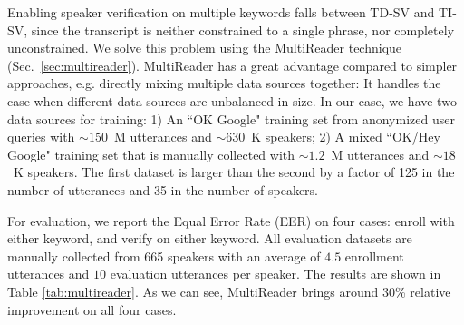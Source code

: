 \documentclass{article}
\begin{document}
Enabling speaker verification on multiple keywords falls between TD-SV and TI-SV,
since the transcript is neither constrained to a single phrase, nor completely
unconstrained. We solve this problem using the MultiReader technique (Sec.~\ref{sec:multireader}).
MultiReader has a great advantage compared to simpler approaches,
e.g. directly mixing multiple data sources together:
It handles the case when different data sources are unbalanced in size.
In our case, we have two data sources for training:
1) An ``OK Google" training set from anonymized user queries with $\sim150$~M utterances and $\sim630$~K speakers;
2) A mixed ``OK/Hey Google" training set that is manually collected with $\sim1.2$~M utterances and $\sim18$~K speakers.
The first dataset is larger than the second by a factor of 125 in the number of utterances and 35 in the number of speakers.



For evaluation, we report the Equal Error Rate (EER) on four cases: enroll with either
keyword, and verify on either keyword. All evaluation datasets are manually collected from 665 speakers with an average of $4.5$ enrollment utterances and $10$ evaluation utterances per speaker.
The results are shown in Table \ref{tab:multireader}.
As we can see, MultiReader brings around 30\% relative improvement on all four
cases.

\begin{table}[t]
  \caption{MultiReader vs. directly mixing multiple data sources.}
  \label{tab:multireader}
  \begin{center}
  \end{center}
\end{table}
\end{document}
